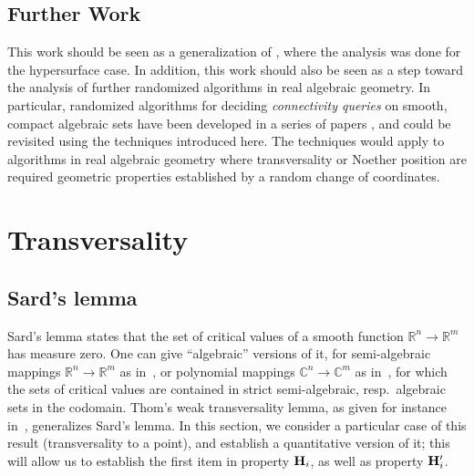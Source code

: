 \documentclass[a4paper]{article}
\def\C{\mathbb{C}}
\def\R{\mathbb{R}}
\begin{document}
\subsection{Further Work}
This work should be seen as a generalization of \cite{ElGiSh20}, where the analysis was done for the hypersurface case. In addition, this work should also be seen as a step toward the analysis of
further randomized algorithms in real algebraic geometry.  In particular, randomized algorithms for deciding {\em
  connectivity queries} on smooth, compact algebraic sets have been
developed in a series of papers
\cite{SchostMohabBabySteps2011,SchostMohabBabySteps2014}, and could be
revisited using the techniques introduced here. The techniques would apply to algorithms in real algebraic geometry where transversality or Noether position are required geometric properties established by a random change of coordinates.



\section{Transversality}


\subsection{Sard's lemma}
Sard's lemma states that the set of critical values of a smooth
function $\R^n \to \R^m$ has measure zero. One can give ``algebraic''
versions of it, for semi-algebraic mappings $\R^n \to \R^m$ as
in~\cite[Chapter~9]{bochnak1998real}, or polynomial mappings $\C^n \to
\C^m$ as in~\cite[Chapter~3]{Mumford76}, for which the sets of
critical values are contained in strict semi-algebraic,
resp.\ algebraic sets in the codomain. Thom's weak transversality
lemma, as given for instance in~\cite{demazure2000bifurcations},
generalizes Sard's lemma. In this section, we consider a particular
case of this result (transversality to a point), and establish a
quantitative version of it; this will allow us to establish the first
item in property ${\bf H}_i$, as well as property ${\bf H}'_i$. 


\end{document}
